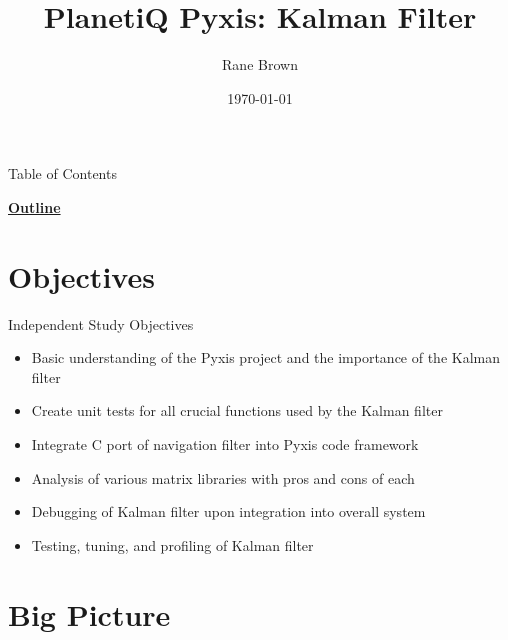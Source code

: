 \documentclass[10pt,aspectratio=169]{beamer}
\title{PlanetiQ Pyxis: Kalman Filter}
\institute{University of Colorado Boulder}
\author{Rane Brown}
\date{\today}
\begin{document}
\begin{frame}[t,plain] %
    \titlepage
\end{frame}

\begin{frame}[t]{Table of Contents}
    \begin{center}
        \vspace{-2em}
        {\Large \textbf{\underline{Outline}}}
        \vspace{1em}
    \end{center}
    \begin{multicols}{2}
        \tableofcontents
    \end{multicols}
\end{frame}

\section{Objectives}%

    \begin{frame}{Independent Study Objectives}
        \begin{itemize}
            \item Basic understanding of the Pyxis project and the importance of the Kalman filter
            \item Create unit tests for all crucial functions used by the Kalman filter
            \item Integrate C port of navigation filter into Pyxis code framework
            \item Analysis of various matrix libraries with pros and cons of each
            \item Debugging of Kalman filter upon integration into overall system
            \item Testing, tuning, and profiling of Kalman filter
        \end{itemize}
    \end{frame}

\section{Big Picture}%
\end{document}
